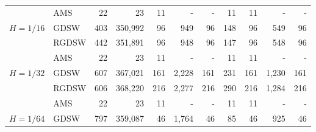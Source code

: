 \begin{table}[H]
\begin{tabular}{llrrrrrrrrr}
\cline{2-11}
\bfseries  & AMS & 22 & {\cellcolor[HTML]{405FE5}} \color[HTML]{F1F1F1} 23 & 11 & {\cellcolor[HTML]{ACB8F4}} \color[HTML]{000000} {\cellcolor[HTML]{E2E4FB}} - & - & {\cellcolor[HTML]{768BEC}} \color[HTML]{F1F1F1} 11 & 11 & {\cellcolor[HTML]{E2E4FB}} \color[HTML]{000000} {\cellcolor[HTML]{E2E4FB}} - & - \\
\cline{1-11} \cline{2-11}
\multirow[c]{3}{*}{\bfseries $H=1/16$} & GDSW & 403 & {\cellcolor[HTML]{E2E4FB}} \color[HTML]{000000} 350,992 & 96 & {\cellcolor[HTML]{ACB8F4}} \color[HTML]{000000} 949 & 96 & {\cellcolor[HTML]{768BEC}} \color[HTML]{F1F1F1} 148 & 96 & {\cellcolor[HTML]{405FE5}} \color[HTML]{F1F1F1} 549 & 96 \\
\cline{2-11}
\bfseries  & RGDSW & 442 & {\cellcolor[HTML]{E2E4FB}} \color[HTML]{000000} 351,891 & 96 & {\cellcolor[HTML]{ACB8F4}} \color[HTML]{000000} 948 & 96 & {\cellcolor[HTML]{768BEC}} \color[HTML]{F1F1F1} 147 & 96 & {\cellcolor[HTML]{405FE5}} \color[HTML]{F1F1F1} 548 & 96 \\
\cline{2-11}
\bfseries  & AMS & 22 & {\cellcolor[HTML]{405FE5}} \color[HTML]{F1F1F1} 23 & 11 & {\cellcolor[HTML]{ACB8F4}} \color[HTML]{000000} {\cellcolor[HTML]{E2E4FB}} - & - & {\cellcolor[HTML]{768BEC}} \color[HTML]{F1F1F1} 11 & 11 & {\cellcolor[HTML]{E2E4FB}} \color[HTML]{000000} {\cellcolor[HTML]{E2E4FB}} - & - \\
\cline{1-11} \cline{2-11}
\multirow[c]{3}{*}{\bfseries $H=1/32$} & GDSW & 607 & {\cellcolor[HTML]{E2E4FB}} \color[HTML]{000000} 367,021 & 161 & {\cellcolor[HTML]{ACB8F4}} \color[HTML]{000000} 2,228 & 161 & {\cellcolor[HTML]{405FE5}} \color[HTML]{F1F1F1} 231 & 161 & {\cellcolor[HTML]{768BEC}} \color[HTML]{F1F1F1} 1,230 & 161 \\
\cline{2-11}
\bfseries  & RGDSW & 606 & {\cellcolor[HTML]{E2E4FB}} \color[HTML]{000000} 368,220 & 216 & {\cellcolor[HTML]{ACB8F4}} \color[HTML]{000000} 2,277 & 216 & {\cellcolor[HTML]{405FE5}} \color[HTML]{F1F1F1} 290 & 216 & {\cellcolor[HTML]{768BEC}} \color[HTML]{F1F1F1} 1,284 & 216 \\
\cline{2-11}
\bfseries  & AMS & 22 & {\cellcolor[HTML]{405FE5}} \color[HTML]{F1F1F1} 23 & 11 & {\cellcolor[HTML]{ACB8F4}} \color[HTML]{000000} {\cellcolor[HTML]{E2E4FB}} - & - & {\cellcolor[HTML]{768BEC}} \color[HTML]{F1F1F1} 11 & 11 & {\cellcolor[HTML]{E2E4FB}} \color[HTML]{000000} {\cellcolor[HTML]{E2E4FB}} - & - \\
\cline{1-11} \cline{2-11}
\multirow[c]{3}{*}{\bfseries $H=1/64$} & GDSW & 797 & {\cellcolor[HTML]{E2E4FB}} \color[HTML]{000000} 359,087 & 46 & {\cellcolor[HTML]{ACB8F4}} \color[HTML]{000000} 1,764 & 46 & {\cellcolor[HTML]{768BEC}} \color[HTML]{F1F1F1} 85 & 46 & {\cellcolor[HTML]{405FE5}} \color[HTML]{F1F1F1} 925 & 46 \\

\end{tabular}
\end{table}
